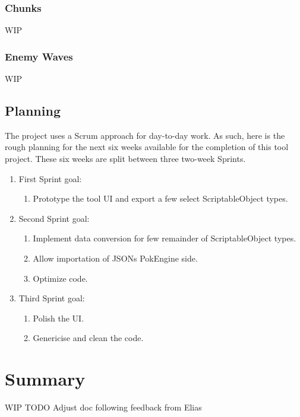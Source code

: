 \documentclass[12pt,a4paper]{article}
\begin{document}
\subsubsection{Chunks}
WIP
\subsubsection{Enemy Waves}
WIP

\subsection{Planning}
The project uses a Scrum approach for day-to-day work. As such, here is the rough planning for the next six weeks available for the completion of this tool project. These six weeks are split between three two-week Sprints.

\begin{enumerate}
\item First Sprint goal:
	\begin{enumerate}
	\item Prototype the tool UI and export a few select ScriptableObject types.
	\end{enumerate}
\item Second Sprint goal:
	\begin{enumerate}
	\item Implement data conversion for few remainder of ScriptableObject types.
	\item Allow importation of JSONs PokEngine side.
	\item Optimize code.
	\end{enumerate}
\item Third Sprint goal:
	\begin{enumerate}
	\item Polish the UI.
	\item Genericise and clean the code.
	\end{enumerate}
\end{enumerate}

\section{Summary}
WIP
TODO Adjust doc following feedback from Elias
\end{document}
